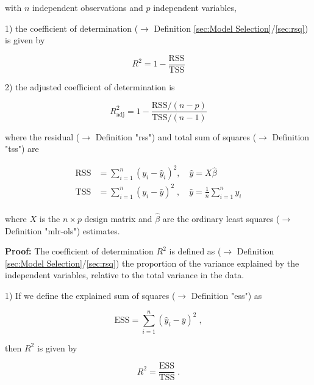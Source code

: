 \documentclass[a4paper,12pt]{book}
\begin{document}
with $n$ independent observations and $p$ independent variables,

1) the coefficient of determination ($\rightarrow$ Definition \ref{sec:Model Selection}/\ref{sec:rsq}) is given by

\begin{equation} \label{eq:rsq-der-R2}
R^2 = 1 - \frac{\mathrm{RSS}}{\mathrm{TSS}}
\end{equation}

2) the adjusted coefficient of determination is

\begin{equation} \label{eq:rsq-der-R2-adj}
R^2_{\mathrm{adj}} = 1 - \frac{\mathrm{RSS}/(n-p)}{\mathrm{TSS}/(n-1)}
\end{equation}

where the residual ($\rightarrow$ Definition "rss") and total sum of squares ($\rightarrow$ Definition "tss") are

\begin{equation} \label{eq:rsq-der-SS}
\begin{split}
\mathrm{RSS} &= \sum_{i=1}^{n} (y_i - \hat{y}_i)^2, \quad \hat{y} = X\hat{\beta} \\
\mathrm{TSS} &= \sum_{i=1}^{n} (y_i - \bar{y})^2\;, \quad \bar{y} = \frac{1}{n} \sum_{i=1}^n y_i \\
\end{split}
\end{equation}

where $X$ is the $n \times p$ design matrix and $\hat{\beta}$ are the ordinary least squares ($\rightarrow$ Definition "mlr-ols") estimates.


\vspace{1em}
\textbf{Proof:} The coefficient of determination $R^2$ is defined as ($\rightarrow$ Definition \ref{sec:Model Selection}/\ref{sec:rsq}) the proportion of the variance explained by the independent variables, relative to the total variance in the data.

\vspace{1em}
1) If we define the explained sum of squares ($\rightarrow$ Definition "ess") as

\begin{equation} \label{eq:rsq-der-ESS}
\mathrm{ESS} = \sum_{i=1}^{n} (\hat{y}_i - \bar{y})^2 \; ,
\end{equation}

then $R^2$ is given by

\begin{equation} \label{eq:rsq-der-R2-s1}
R^2 = \frac{\mathrm{ESS}}{\mathrm{TSS}} \; .
\end{equation}
\end{document}
